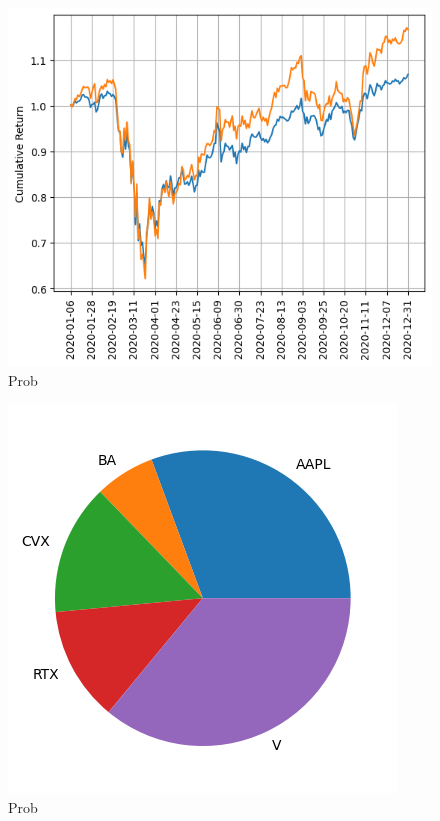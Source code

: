 \begin{figure}[h]
  \begin{center}
    \includegraphics[width=0.6\linewidth]{figures/replica_portfolio}
  \end{center}
  \caption{Prob}
  \label{fig:replica_portfolio_return}
\end{figure}

\begin{figure}[h]
  \begin{center}
    \includegraphics[width=0.6\linewidth]{figures/replica_portfolio_weights}
  \end{center}
  \caption{Prob}
  \label{fig:replica_portfolio_weights}
\end{figure}

